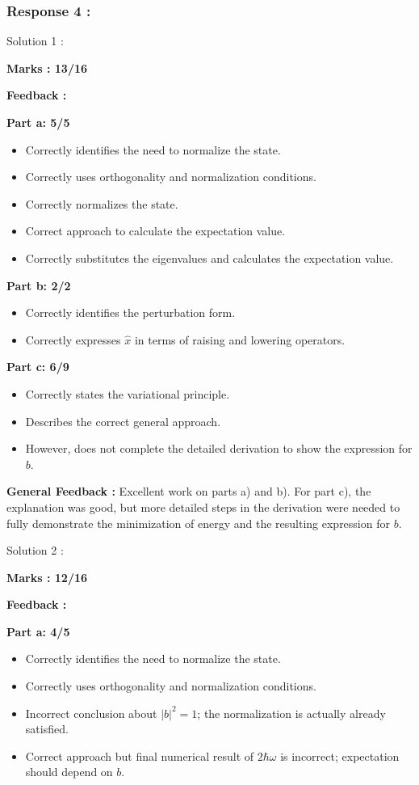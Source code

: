 \documentclass[a4paper,11pt]{article}
\begin{document}
\subsubsection*{Response 4 :}

Solution 1 :

\textbf{Marks : 13/16}

\textbf{Feedback :}

\textbf{Part a: 5/5}
\begin{itemize}
    \item Correctly identifies the need to normalize the state.
    \item Correctly uses orthogonality and normalization conditions.
    \item Correctly normalizes the state.
    \item Correct approach to calculate the expectation value.
    \item Correctly substitutes the eigenvalues and calculates the expectation value.
\end{itemize}

\textbf{Part b: 2/2}
\begin{itemize}
    \item Correctly identifies the perturbation form.
    \item Correctly expresses $\hat{x}$ in terms of raising and lowering operators.
\end{itemize}

\textbf{Part c: 6/9}
\begin{itemize}
    \item Correctly states the variational principle.
    \item Describes the correct general approach.
    \item However, does not complete the detailed derivation to show the expression for $b$.
\end{itemize}

\textbf{General Feedback :}
Excellent work on parts a) and b). For part c), the explanation was good, but more detailed steps in the derivation were needed to fully demonstrate the minimization of energy and the resulting expression for $b$.


Solution 2 :

\textbf{Marks : 12/16}

\textbf{Feedback :}

\textbf{Part a: 4/5}
\begin{itemize}
    \item Correctly identifies the need to normalize the state.
    \item Correctly uses orthogonality and normalization conditions.
    \item Incorrect conclusion about $|b|^2 = 1$; the normalization is actually already satisfied.
    \item Correct approach but final numerical result of $2\hbar \omega$ is incorrect; expectation should depend on $b$.
\end{itemize}
\end{document}

